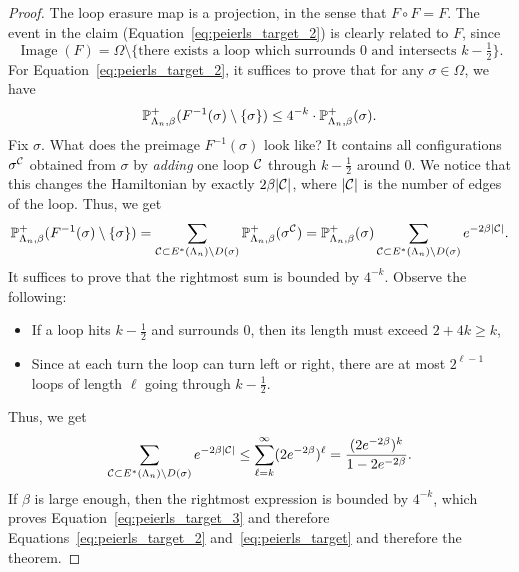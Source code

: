 \begin{proof}
    The loop erasure map is a projection,
    in the sense that $F\circ F=F$.
    The event in the claim (Equation~\eqref{eq:peierls_target_2}) is clearly
    related to $F$, since
    \[
        \operatorname{Image}(F)
        =
        \Omega\setminus
        \{\text{there exists a loop which surrounds $0$ and intersects $k-\tfrac12$}\}.
    \]
    For Equation~\eqref{eq:peierls_target_2},
    it suffices to prove that for any $\sigma\in\Omega$,
    we have
    \begin{equation}
        \label{eq:peierls_target_3}
        \P_{\Lambda_n,\beta}^+
        (F^{-1}(\sigma)\setminus\{\sigma\})
        \leq 4^{-k}
        \cdot
        \P_{\Lambda_n,\beta}^+
        (\sigma).
    \end{equation}
    Fix $\sigma$.
    What does the preimage $F^{-1}(\sigma)$ look like?
    It contains all configurations $\sigma^\mathcal C$ obtained from $\sigma$
    by \emph{adding} one loop $\mathcal C$ through $k-\frac12$ around $0$.
    We notice that this changes the Hamiltonian by exactly $2\beta|\mathcal C|$,
    where $|\mathcal C|$ is the number of edges of the loop.
    Thus, we get
    \[
        \mathbb P_{\Lambda_n,\beta}^+
        (F^{-1}(\sigma)\setminus\{\sigma\})
        =
        \sum_{\mathcal C\subset E^*(\Lambda_n)\setminus D(\sigma)}
        \mathbb P_{\Lambda_n,\beta}^+
        (\sigma^\mathcal C)
        =
        \mathbb P_{\Lambda_n,\beta}^+
        (\sigma)
        \sum_{\mathcal C\subset E^*(\Lambda_n)\setminus D(\sigma)}
        e^{-2\beta|\mathcal C|}.
    \]
    It suffices to prove that the rightmost sum is bounded by $4^{-k}$.
    Observe the following:
    \begin{itemize}
        \item If a loop hits $k-\frac12$ and surrounds $0$, then its length must exceed $2+4k\geq k$,
        \item Since at each turn the loop can turn left or right, there are at most $2^{\ell-1}$ loops of length $\ell$ going through $k-\frac12$.
    \end{itemize}
    Thus, we get
    \[
        \sum_{\mathcal C\subset E^*(\Lambda_n)\setminus D(\sigma)}
        e^{-2\beta|\mathcal C|}
        \leq
        \sum_{\ell=k}^\infty
        (2e^{-2\beta})^\ell
        =\frac{(2e^{-2\beta})^k}{1-2e^{-2\beta}}.
    \]
    If $\beta$ is large enough,
    then the rightmost expression is bounded by $4^{-k}$,
    which proves Equation~\eqref{eq:peierls_target_3}
    and therefore Equations~\eqref{eq:peierls_target_2}
    and~\eqref{eq:peierls_target}
    and therefore the theorem.
\end{proof}

